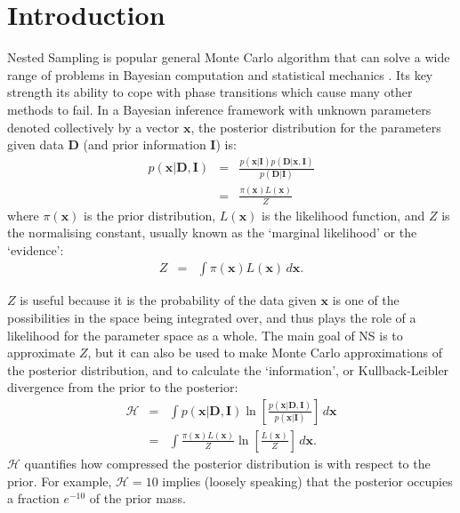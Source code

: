 \documentclass[journal,article,accept,moreauthors,pdftex,12pt,a4paper]{mdpi}
\newcommand{\xx}{\boldsymbol{x}}
\newcommand{\dx}{d\boldsymbol{x}}
\newcommand{\data}{\boldsymbol{D}}
\newcommand{\II}{\boldsymbol{I}}
\begin{document}

\section{Introduction}

Nested Sampling \citep[NS][]{skilling} is popular general
Monte Carlo algorithm that can solve a wide range of problems in Bayesian
computation and statistical mechanics
\citep{2009arXiv0906.3544P, 2014PhRvE..89b2302P, 2015arXiv150303404B}.
Its key strength its ability to cope with phase transitions which cause
many other methods to fail.
In a Bayesian inference framework with unknown parameters denoted collectively
by a vector $\xx$, the
posterior distribution for the parameters given data $\data$ (and prior
information $\II$) is:
\begin{eqnarray}
p(\xx | \data, \II) &=&
\frac{p(\xx | \II)p(\data | \xx, \II)}{p(\data | \II)}\\
&=& \frac{\pi(\xx)L(\xx)}{Z}
\end{eqnarray}
where $\pi(\xx)$ is the prior distribution, $L(\xx)$ is the likelihood
function, and $Z$ is the normalising constant, usually known as the
`marginal likelihood' or the `evidence':
\begin{eqnarray}
Z &=& \int \pi(\xx) L(\xx) \, \dx.\label{eqn:evidence}
\end{eqnarray}

$Z$ is useful because it is the probability of the data given $\xx$ is one of
the possibilities in the space being integrated over, and thus plays the role
of a likelihood for the parameter space as a whole.
The main goal of NS is to approximate $Z$, but it can also be used to make
Monte Carlo approximations of the posterior distribution, and to
calculate the `information',
or Kullback-Leibler divergence from the prior to the posterior:
\begin{eqnarray}
\mathcal{H} &=& \int p(\xx | \data, \II) \ln
\left[\frac{p(\xx | \data, \II)}{p(\xx | \II)}\right] \, d\xx \\
&=& \int \frac{\pi(\xx) L(\xx)}{Z} \ln
\left[\frac{L(\xx)}{Z}\right] \, d\xx.
\end{eqnarray}
$\mathcal{H}$ quantifies how compressed the posterior distribution is with
respect to the prior. For example, $\mathcal{H} = 10$ implies (loosely speaking)
that the posterior occupies a fraction $e^{-10}$ of the prior mass.
\end{document}
